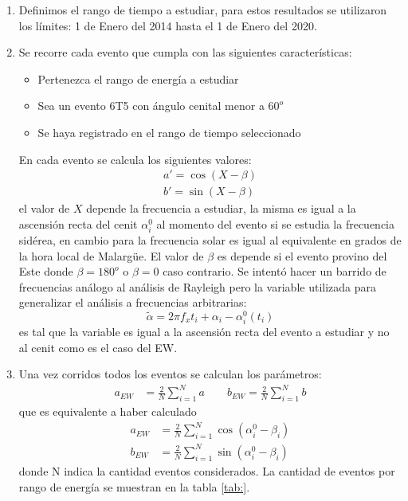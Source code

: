 \begin{enumerate}
    \item Definimos el rango de tiempo a estudiar, para estos resultados se utilizaron los límites: 1 de Enero del 2014 hasta el 1 de Enero del 2020.
    \item Se recorre cada evento que cumpla con las siguientes características:
     \begin{itemize}
        \item Pertenezca el rango de energía a estudiar
        \item Sea un evento 6T5 con ángulo cenital menor a $60^o$
        \item Se haya registrado en el rango de tiempo seleccionado
    \end{itemize}
    En cada evento se calcula los siguientes valores:
    \begin{align}
        a' = \cos(X - \beta)\\
        b' = \sin(X - \beta)
    \end{align}
    el valor de $X$ depende la frecuencia a estudiar, la misma es igual a la ascensión recta del cenit $\alpha^0_i$ al momento del evento  si se estudia la frecuencia sidérea, en cambio para la frecuencia solar es igual al equivalente en grados de la hora local de Malargüe. El valor de $\beta$ es depende si el evento provino del Este donde $\beta=180^o$ o $\beta=0$ caso contrario.
    Se intentó hacer un barrido de frecuencias análogo al análisis de Rayleigh pero la variable utilizada para generalizar el análisis a frecuencias arbitrarias:
    \begin{equation}
        \tilde{\alpha} = 2\pi f_x t_i + \alpha_i - \alpha_i^0(t_i) \label{ra_mod}
      \end{equation}
    es tal que la variable es igual a la ascensión recta del evento a estudiar y no al cenit como es el caso del EW. 
    \item Una vez corridos todos los  eventos se calculan los parámetros:
    \begin{align*}
        a_{EW} &= \frac{2}{N} \sum^N_{i=1} a \qquad
        b_{EW} = \frac{2}{N} \sum^N_{i=1} b
    \end{align*}
    que es equivalente a haber calculado
    \begin{align*}
        a_{EW} &= \frac{2}{N} \sum^N_{i=1} \cos(\alpha^0_i - \beta_i)\\
        b_{EW} &= \frac{2}{N} \sum^N_{i=1} \sin(\alpha^0_i - \beta_i)
    \end{align*}
    donde N indica la cantidad eventos considerados. La cantidad de eventos por rango de energía se muestran en la tabla \ref{tab:}.


\end{enumerate}
